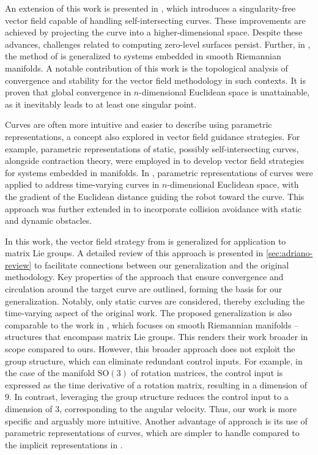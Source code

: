 An extension of this work is presented in \citet{yao2021singularity}, which introduces a singularity-free vector field capable of handling self-intersecting curves. These improvements are achieved by projecting the curve into a higher-dimensional space. Despite these advances, challenges related to computing zero-level surfaces persist. Further, in \citet{yao2022topological}, the method of \citet{goncalves2010vectorfield} is generalized to systems embedded in smooth Riemannian manifolds. A notable contribution of this work is the topological analysis of convergence and stability for the vector field methodology in such contexts. It is proven that global convergence in $n$-dimensional Euclidean space is unattainable, as it inevitably leads to at least one singular point.

Curves are often more intuitive and easier to describe using parametric representations, a concept also explored in vector field guidance strategies. For example, parametric representations of static, possibly self-intersecting curves, alongside contraction theory, were employed in \citet{Wu2018} to develop vector field strategies for systems embedded in manifolds. In \citet{Rezende2022}, parametric representations of curves were applied to address time-varying curves in $n$-dimensional Euclidean space, with the gradient of the Euclidean distance guiding the robot toward the curve. This approach was further extended in \citet{Nunes2022} to incorporate collision avoidance with static and dynamic obstacles.

In this work, the vector field strategy from \citet{Rezende2022} is generalized for application to matrix Lie groups. A detailed review of this approach is presented in \cref{sec:adriano-review} to facilitate connections between our generalization and the original methodology. Key properties of the approach that ensure convergence and circulation around the target curve are outlined, forming the basis for our generalization. Notably, only static curves are considered, thereby excluding the time-varying aspect of the original work. The proposed generalization is also comparable to the work in \citet{yao2022topological}, which focuses on smooth Riemannian manifolds -- structures that encompass matrix Lie groups. This renders their work broader in scope compared to ours. However, this broader approach does not exploit the group structure, which can eliminate redundant control inputs. For example, in the case of the manifold $\text{SO}(3)$ of rotation matrices, the control input is expressed as the time derivative of a rotation matrix, resulting in a dimension of $9$. In contrast, leveraging the group structure reduces the control input to a dimension of $3$, corresponding to the angular velocity. Thus, our work is more specific and arguably more intuitive. Another advantage of  approach is its use of parametric representations of curves, which are simpler to handle compared to the implicit representations in \citet{yao2022topological}.

